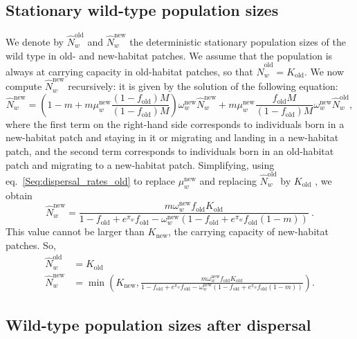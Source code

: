 \documentclass[11pt]{article}
\begin{document}
\subsection{Stationary wild-type population sizes}
We denote by $\widehat{N}_w^{\text{old}}$ and $\widehat{N}_w^{\text{new}}$ the deterministic stationary population sizes of the wild type in old- and new-habitat patches. We assume that the population is always at carrying capacity in old-habitat patches, so that $\widehat{N}_w^{\text{old}} = K_{\text{old}}$. We now compute $\widehat{N}_w^{\text{new}}$ recursively: it is given by the solution of the following equation: 
%
\begin{equation}\label{Seq:wt_deme2}
\widehat{N}_w^{\text{new}} = \left(1-m + m \mu_w^{\text{new}}  \frac{(1-f_{\text{old}})M}{(1-f_{\text{old}})M}\right)  \omega_w^{\text{new}}  \widehat{N}_w^{\text{new}}   + m \mu_w^{\text{new}} \frac{f_{\text{old}} M}{(1-f_{\text{old}})M} \omega_w^{\text{new}}  \widehat{N}_w^{\text{old}}, \nonumber 
\end{equation}
where the first term on the right-hand side corresponds to individuals born in a new-habitat patch and staying in it or migrating and landing in a new-habitat patch, and the second term corresponds to individuals born in an old-habitat patch and migrating to a new-habitat patch. Simplifying, using eq.~\eqref{Seq:dispersal_rates_old} to replace $\mu_w^{\text{new}} $ and replacing $\widehat{N}_w^{\text{old}}$ by $K_{\text{old}}$ , we obtain
%
\begin{equation}
\widehat{N}_w^{\text{new}} = \frac{m \omega_w^{\text{new}} f_{\text{old}}  K_{\text{old}}}{
1-f_{\text{old}} + e^{\pi_w} f_{\text{old}} - \omega_w^{\text{new}} (1-f_{\text{old}} + e^{\pi_w} f_{\text{old}} (1-m))
}
\ .
\end{equation}
%
This value cannot be larger than $K_{\text{new}}$, the carrying capacity of new-habitat patches. So, 
\begin{subequations}\label{Seq:Nhat}
	\begin{align}
	\widehat{N}_w^{\text{old}} &= K_{\text{old}} \\
	\widehat{N}_w^{\text{new}} &= \min\left(K_{\text{new}},  \frac{m \omega_w^{\text{new}} f_{\text{old}}  K_{\text{old}}}{
	1-f_{\text{old}} +  e^{\pi_w} f_{\text{old}} - \omega_w^{\text{new}} (1-f_{\text{old}} + e^{\pi_w} f_{\text{old}} (1-m))
} \right).\label{Seq:Nhatnew}
	\end{align}
\end{subequations}

\subsection{Wild-type population sizes after dispersal}
\end{document}
